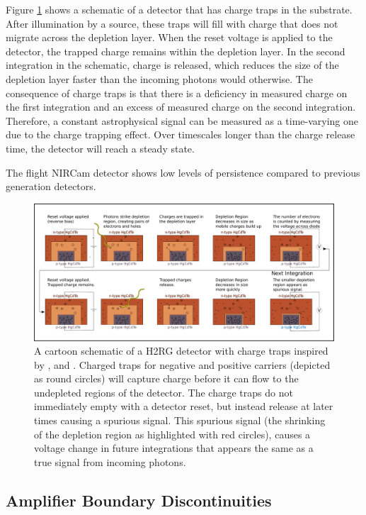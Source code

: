 \documentclass{aastex62}
\begin{document}
Figure \ref{fig:npSchematicTraps} shows a schematic of a detector that has charge traps in the substrate.
After illumination by a source, these traps will fill with charge that does not migrate across the depletion layer.
When the reset voltage is applied to the detector, the trapped charge remains within the depletion layer.
In the second integration in the schematic, charge is released, which reduces the size of the depletion layer faster than the incoming photons would otherwise.
The consequence of charge traps is that there is a deficiency in measured charge on the first integration and an excess of measured charge on the second integration.
Therefore, a constant astrophysical signal can be measured as a time-varying one due to the charge trapping effect.
Over timescales longer than the charge release time, the detector will reach a steady state.

The flight NIRCam detector shows low levels of persistence compared to previous generation detectors.

\begin{figure}[!hbtp]
\centering
\includegraphics[width=.99\columnwidth]{charge_traps_photodiode.pdf}
\caption{A cartoon schematic of a H2RG detector with charge traps inspired by \citet{smith2008imgPersistence}, \citet{tulloch2018persistenceH2RG} and \citet{leisenring2016persistence}.
Charged traps for negative and positive carriers (depicted as round circles) will capture charge before it can flow to the undepleted regions of the detector.
The charge traps do not immediately empty with a detector reset, but instead release at later times causing a spurious signal.
This spurious signal (the shrinking of the depletion region as highlighted with red circles), causes a voltage change in future integrations that appears the same as a true signal from incoming photons.}\label{fig:npSchematicTraps}
\end{figure}

\subsection{Amplifier Boundary Discontinuities}
\end{document}

